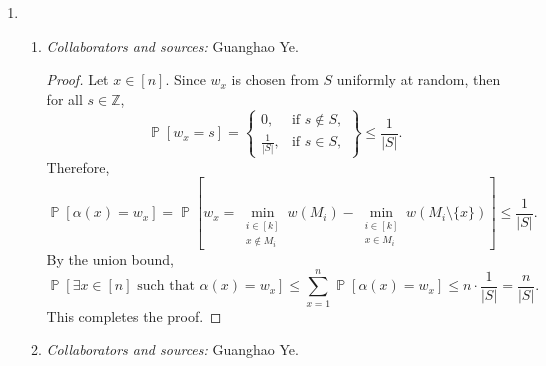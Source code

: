 \documentclass[letterpaper, reqno,11pt]{article}
\newcommand{\ZZ}{\mathbb{Z}}
\newcommand{\PP}{\mathop{{}\mathbb{P}}}
\begin{document}
\begin{enumerate}
\begin{enumerate}
    \clearpage

    \item \noindent\emph{Collaborators and sources:} none.

    \bigskip

    \begin{proof}
      Note that any algorithm which generates $n$ pairwise independent random bits samples a vector $\mathbf x$ from a pairwise independent space $S = \{ \mathbf x^{(1)}, \ldots, \mathbf x^{(s)} \}$ on $n$ variables. By part (b), any pairwise independent space $S$ on $n$ variables has size $|S| \geq n$. Therefore, any algorithm that generates $n$ pairwise independent random bits requires at least $\log n$ truly random bits to sample a vector from a space of size $n$. This implies that the construction is optimal, completing the proof.
    \end{proof}
  \end{enumerate}

  \clearpage

  \item \begin{enumerate}
    \item \noindent\emph{Collaborators and sources:} Guanghao Ye.

    \bigskip

    \begin{proof}
      Let $x \in [n]$. Since $w_x$ is chosen from $S$ uniformly at random, then for all $s \in \ZZ$,
      $$ \PP\left[w_x = s\right] = \left\{
        \begin{array}{ll}
          0, & \text{if $s \not \in S$}, \\
          \frac{1}{|S|}, & \text{if $s \in S$},
        \end{array}
      \right\} \leq \frac{1}{|S|}. $$
      Therefore,
      $$ \PP[\alpha(x) = w_x] = \PP\left[w_x = \min_{\substack{i \in [k] \\ x \not \in M_i}} w\left(M_i\right) - \min_{\substack{i \in [k] \\ x \in M_i}} w\left(M_i \setminus \{ x \}\right)\right] \leq \frac{1}{|S|}. $$
      By the union bound,
      $$ \PP\left[\exists x \in [n] \text{ such that } \alpha(x) = w_x\right] \leq \sum_{x = 1}^n \PP\left[\alpha(x) = w_x\right] \leq n \cdot \frac{1}{|S|} = \frac{n}{|S|}. $$
      This completes the proof.
    \end{proof}

    \clearpage

    \item \noindent\emph{Collaborators and sources:} Guanghao Ye.


\end{enumerate}
\end{enumerate}
\end{document}
